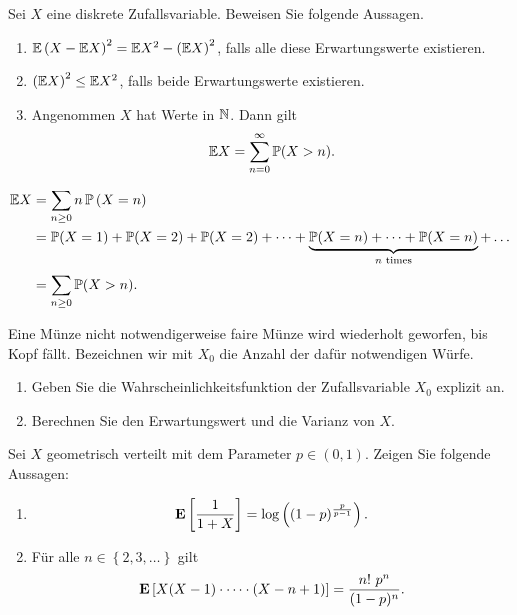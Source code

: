  Sei $X$ eine diskrete
Zufallsvariable. Beweisen Sie folgende Aussagen.
\begin{enumerate}
    \item $\mathbb E \left( X - \mathbb E X \right)^2 = \mathbb E X^2 - \left( \mathbb E X \right)^2$, falls alle diese
        Erwartungswerte existieren.
    \item $\left( \mathbb E X \right)^2 \leq \mathbb E X^{2}$, falls beide Erwartungswerte existieren. 
    \item Angenommen $X$ hat Werte in $\mathbb N$. Dann gilt
        \begin{equation*}
            \mathbb E X = \sum_{n=0}^{\infty} \mathbb P(X > n). 
        \end{equation*}
\end{enumerate}

\solution 
\begin{align*}
    \mathbb E X &= \sum_{n\geq 0} n\, \mathbb P\left( X=n \right) \\
    &= \mathbb P(X=1)+\mathbb P(X=2)+\mathbb P(X=2)+\dots+ \underbrace{\mathbb P(X=n)+\dots+\mathbb P(X=n)}_{n \text{ times}} + \dots \\
    &= \sum_{n\geq 0}^{} \mathbb P(X>n).
\end{align*}


 Eine Münze nicht
notwendigerweise faire Münze wird wiederholt geworfen, bis Kopf fällt.
Bezeichnen wir mit $X_0$ die Anzahl der dafür notwendigen Würfe.
\begin{enumerate}
    \item Geben Sie die Wahrscheinlichkeitsfunktion der Zufallsvariable $X_0$ 
        explizit an.
    \item Berechnen Sie den Erwartungswert und die Varianz von $X$.
\end{enumerate}


 Sei $X$ geometrisch
verteilt mit dem Parameter $p\in (0,1)$. Zeigen Sie folgende Aussagen: 
\begin{enumerate}
    \item \begin{equation*}
            \mathbf E \left[ \frac{1}{1+X} \right] = \log \left( (1-p)^{\frac{p}{p-1}} \right).
        \end{equation*}

    \item Für alle $n\in \left\{ 2,3, \dots \right\}$ gilt
        \begin{equation*}
            \mathbf E \left[ X(X-1)\cdot \dots \cdot (X - n+1) \right] = \frac{n!\ p^n}{(1-p)^n}.
        \end{equation*}
\end{enumerate}

